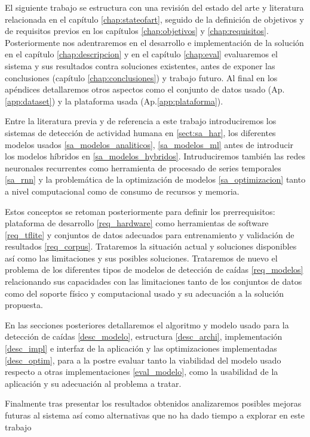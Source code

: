 \documentclass[../tfm.tex]{subfiles}
\begin{document}
El siguiente trabajo se estructura con una revisión del estado del arte y literatura relacionada en el capítulo \ref{chap:stateofart}, seguido de la definición de objetivos y de requisitos previos en los capítulos \ref{chap:objetivos} y \ref{chap:requisitos}. Posteriormente nos adentraremos en el desarrollo e implementación de la solución en el capítulo \ref{chap:descripcion} y en el capítulo \ref{chap:eval} evaluaremos el sistema y sus resultados contra soluciones existentes, antes de exponer las conclusiones (capítulo \ref{chap:conclusiones}) y trabajo futuro. Al final en los apéndices detallaremos otros aspectos como el conjunto de datos usado (Ap.\ref{app:dataset}) y la plataforma usada (Ap.\ref{app:plataforma}).

Entre la literatura previa y de referencia a este trabajo introduciremos los sistemas de detección de actividad humana en \ref{sect:sa_har}, los diferentes modelos usados \ref{sa_modelos_analiticos}, \ref{sa_modelos_ml} antes de introducir los modelos híbridos en \ref{sa_modelos_hybridos}. Intruduciremos también las redes neuronales recurrentes como herramienta de procesado de series temporales \ref{sa_rnn} y la problemática de la optimización de modelos \ref{sa_optimizacion} tanto a nivel computacional como de consumo de recursos y memoria.

Estos conceptos se retoman posteriormente para definir los prerrequisitos: plataforma de desarrollo \ref{req_hardware} como herramientas de software \ref{req_tflite} y conjuntos de datos adecuados para entrenamiento y validación de resultados \ref{req_corpus}. Trataremos la situación actual y soluciones disponibles así como las limitaciones y sus posibles soluciones. Trataremos de nuevo el problema de los diferentes tipos de modelos de detección de caídas \ref{req_modelos} relacionando sus capacidades con las limitaciones tanto de los conjuntos de datos como del soporte físico y computacional usado y su adecuación a la solución propuesta.

En las secciones posteriores detallaremos el algoritmo y modelo usado para la detección de caídas \ref{desc_modelo}, estructura \ref{desc_archi}, implementación \ref{desc_impl} e interfaz de la aplicación y las optimizaciones implementadas \ref{desc_optim}, para a la postre evaluar tanto la viabilidad del modelo usado respecto a otras implementaciones \ref{eval_modelo}, como la usabilidad de la aplicación y su adecuación al problema a tratar.

Finalmente tras presentar los resultados obtenidos analizaremos posibles mejoras futuras al sistema así como alternativas que no ha dado tiempo a explorar en este trabajo
\end{document}
